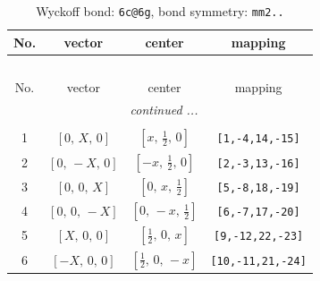 \documentclass[fleqn,8pt]{jsarticle}
\begin{document}
\begin{longtable}{cccc}
\caption{Wyckoff bond: {\tt 6c@6g}, bond symmetry: {\tt mm2..}}
 \\
 \hline \hline
No. & vector & center & mapping \\ \hline \endfirsthead

\multicolumn{3}{l}{\tablename\ \thetable{}} \\
 \hline \hline
No. & vector & center & mapping \\ \hline \endhead

 \hline \hline
\multicolumn{3}{r}{\footnotesize\it continued ...} \\ \endfoot

 \hline \hline
\multicolumn{3}{r}{} \\ \endlastfoot

1 & $\left[ 0,\, X,\, 0 \right]$ & $\left[ x,\, \frac{1}{2},\, 0 \right]$ & {\tt [1,-4,14,-15]} \\ \hline
2 & $\left[ 0,\, - X,\, 0 \right]$ & $\left[ - x,\, \frac{1}{2},\, 0 \right]$ & {\tt [2,-3,13,-16]} \\ \hline
3 & $\left[ 0,\, 0,\, X \right]$ & $\left[ 0,\, x,\, \frac{1}{2} \right]$ & {\tt [5,-8,18,-19]} \\ \hline
4 & $\left[ 0,\, 0,\, - X \right]$ & $\left[ 0,\, - x,\, \frac{1}{2} \right]$ & {\tt [6,-7,17,-20]} \\ \hline
5 & $\left[ X,\, 0,\, 0 \right]$ & $\left[ \frac{1}{2},\, 0,\, x \right]$ & {\tt [9,-12,22,-23]} \\ \hline
6 & $\left[ - X,\, 0,\, 0 \right]$ & $\left[ \frac{1}{2},\, 0,\, - x \right]$ & {\tt [10,-11,21,-24]} \\
\end{longtable}
\renewcommand{\arraystretch}{1.2}
\end{document}
